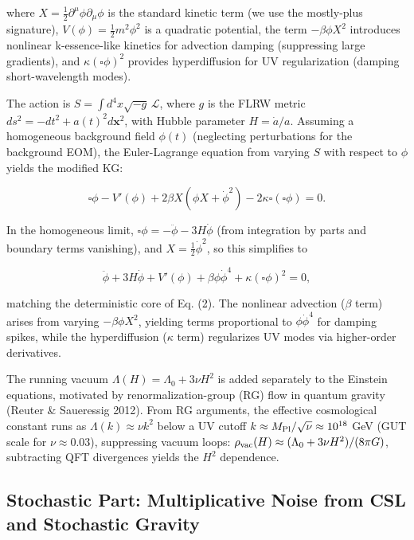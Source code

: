 \documentclass[preprint]{aastex7}
\begin{document}
where \( X = \frac{1}{2} \partial^\mu \phi \partial_\mu \phi \) is the standard kinetic term (we use the mostly-plus signature), \( V(\phi) = \frac{1}{2} m^2 \phi^2 \) is a quadratic potential, the term \( -\beta \phi X^2 \) introduces nonlinear k-essence-like kinetics for advection damping (suppressing large gradients), and \( \kappa (\square \phi)^2 \) provides hyperdiffusion for UV regularization (damping short-wavelength modes).

The action is \( S = \int d^4 x \sqrt{-g} \, \mathcal{L} \), where \( g \) is the FLRW metric \( ds^2 = -dt^2 + a(t)^2 d\mathbf{x}^2 \), with Hubble parameter \( H = \dot{a}/a \). Assuming a homogeneous background field \( \phi(t) \) (neglecting perturbations for the background EOM), the Euler-Lagrange equation from varying \( S \) with respect to \( \phi \) yields the modified KG:

\begin{equation}
\square \phi - V'(\phi) + 2\beta X (\phi X + \dot{\phi}^2) - 2\kappa \square (\square \phi) = 0.
\end{equation}

In the homogeneous limit, \( \square \phi = -\ddot{\phi} - 3H \dot{\phi} \) (from integration by parts and boundary terms vanishing), and \( X = \frac{1}{2} \dot{\phi}^2 \), so this simplifies to

\begin{equation}
\ddot{\phi} + 3H \dot{\phi} + V'(\phi) + \beta \phi \dot{\phi}^4 + \kappa (\square \phi)^2 = 0,
\end{equation}

matching the deterministic core of Eq. (2). The nonlinear advection (\( \beta \) term) arises from varying \( -\beta \phi X^2 \), yielding terms proportional to \( \phi \dot{\phi}^4 \) for damping spikes, while the hyperdiffusion (\( \kappa \) term) regularizes UV modes via higher-order derivatives.

The running vacuum \( \Lambda(H) = \Lambda_0 + 3\nu H^2 \) is added separately to the Einstein equations, motivated by renormalization-group (RG) flow in quantum gravity (Reuter \& Saueressig 2012). From RG arguments, the effective cosmological constant runs as \( \Lambda(k) \approx \nu k^2 \) below a UV cutoff \( k \approx M_{\rm Pl} / \sqrt{\nu} \approx 10^{18} \) GeV (GUT scale for \( \nu \approx 0.03 \)), suppressing vacuum loops: \( \rho_{\rm vac}(H) \approx (\Lambda_0 + 3\nu H^2)/(8\pi G) \), subtracting QFT divergences yields the \( H^2 \) dependence.

\subsection{Stochastic Part: Multiplicative Noise from CSL and Stochastic Gravity}
\end{document}
